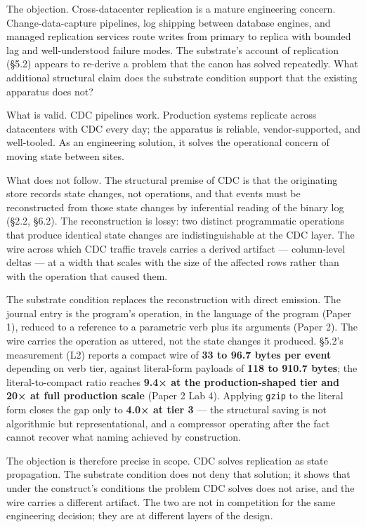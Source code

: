 \documentclass[
]{article}
\begin{document}
The objection. Cross-datacenter replication is a mature engineering
concern. Change-data-capture pipelines, log shipping between database
engines, and managed replication services route writes from primary to
replica with bounded lag and well-understood failure modes. The
substrate's account of replication (§5.2) appears to re-derive a problem
that the canon has solved repeatedly. What additional structural claim
does the substrate condition support that the existing apparatus does
not?

What is valid. CDC pipelines work. Production systems replicate across
datacenters with CDC every day; the apparatus is reliable,
vendor-supported, and well-tooled. As an engineering solution, it solves
the operational concern of moving state between sites.

What does not follow. The structural premise of CDC is that the
originating store records state changes, not operations, and that events
must be reconstructed from those state changes by inferential reading of
the binary log (§2.2, §6.2). The reconstruction is lossy: two distinct
programmatic operations that produce identical state changes are
indistinguishable at the CDC layer. The wire across which CDC traffic
travels carries a derived artifact --- column-level deltas --- at a
width that scales with the size of the affected rows rather than with
the operation that caused them.

The substrate condition replaces the reconstruction with direct
emission. The journal entry is the program's operation, in the language
of the program (Paper 1), reduced to a reference to a parametric verb
plus its arguments (Paper 2). The wire carries the operation as uttered,
not the state changes it produced. §5.2's measurement (L2) reports a
compact wire of \textbf{33 to 96.7 bytes per event} depending on verb
tier, against literal-form payloads of \textbf{118 to 910.7 bytes}; the
literal-to-compact ratio reaches \textbf{9.4× at the production-shaped
tier and 20× at full production scale} (Paper 2 Lab 4). Applying
\texttt{gzip} to the literal form closes the gap only to \textbf{4.0× at
tier 3} --- the structural saving is not algorithmic but
representational, and a compressor operating after the fact cannot
recover what naming achieved by construction.

The objection is therefore precise in scope. CDC solves replication as
state propagation. The substrate condition does not deny that solution;
it shows that under the construct's conditions the problem CDC solves
does not arise, and the wire carries a different artifact. The two are
not in competition for the same engineering decision; they are at
different layers of the design.
\end{document}
